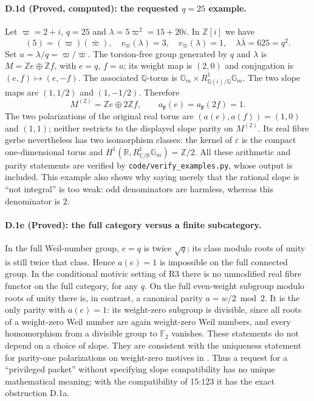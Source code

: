 \paragraph{D.1d (Proved, computed): the requested $q=25$ example.}
Let $\varpi=2+i$, $q=25$ and
$\lambda=5\varpi^2=15+20i$. In $\mathbb Z[i]$ we have
\[
 (5)=(\varpi)(\overline\varpi),\quad
 v_{\varpi}(\lambda)=3,\quad v_{\overline\varpi}(\lambda)=1,
 \quad\lambda\overline\lambda=625=q^2.
\]
Set $u=\lambda/q=\varpi/\overline\varpi$. The torsion-free group generated by
$q$ and $\lambda$ is $M=\mathbb Ze\oplus\mathbb Zf$, with $e=q$, $f=u$;
its weight map is $(2,0)$ and conjugation is $(e,f)\mapsto(e,-f)$. The
associated $\mathbb Q$-torus is
$\mathbb G_m\times R^1_{\mathbb Q(i)/\mathbb Q}\mathbb G_m$. The two slope
maps are $(1,1/2)$ and $(1,-1/2)$. Therefore
\[
 M^{(2)}=\mathbb Ze\oplus2\mathbb Zf,
 \qquad a_{\mathfrak p}(e)=a_{\mathfrak p}(2f)=1.
\]
The two polarizations of the original real torus are $(a(e),a(f))=(1,0)$ and
$(1,1)$; neither restricts to the displayed slope parity on $M^{(2)}$.
Its real fibre gerbe nevertheless has two isomorphism classes: the kernel
of $\varepsilon$ is the compact one-dimensional torus and
$H^1(\mathbb R,R^1_{\mathbb C/\mathbb R}\mathbb G_m)=\mathbb Z/2$.
All these arithmetic and parity statements are verified by
\texttt{code/verify\_examples.py}, whose output is included. This example also
shows why saying merely that the rational slope is ``not integral'' is too
weak: odd denominators are harmless, whereas this denominator is $2$.

\paragraph{D.1e (Proved): the full category versus a finite subcategory.}
In the full Weil-number group, $e=q$ is twice $\sqrt q$; its class modulo roots
of unity is still twice that class. Hence $a(e)=1$ is impossible on the full
connected group. In the conditional motivic setting of R3 there is no
unmodified real fibre functor on the full category, for any $q$.
On the full even-weight subgroup modulo roots of unity there is, in contrast,
a canonical parity $a=w/2\bmod2$. It is the only parity with $a(e)=1$:
its weight-zero subgroup is divisible, since all roots of a weight-zero
Weil number are again weight-zero Weil numbers, and every homomorphism from
a divisible group to $\mathbb F _2$ vanishes. These statements do not depend
on a choice of slope. They are consistent with the uniqueness statement
for parity-one polarizations on weight-zero motives in
\citet[Lemma 2.46]{Milne1994}. Thus a request for a ``privileged packet''
without specifying slope compatibility has no unique mathematical meaning;
with the compatibility of 15:123 it has the exact obstruction D.1a.

